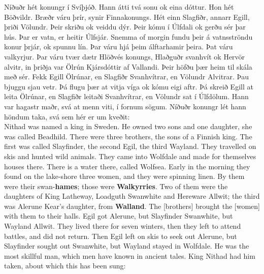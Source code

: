 
\bookStart

\bva Níðuðr hét konungr í Svíþjóð. \bva Hann átti tvá sonu ok eina dóttur. Hon hét Böðvildr. \bva Bræðr váru þrír, synir Finnakonungs. \bva Hét einn Slagfiðr, annarr Egill, þriði Völundr. \bva Þeir skriðu ok veiddu dýr. Þeir kómu í Úlfdali ok gerðu sér þar hús. \bva Þar er vatn, er heitir Úlfsjár. \bva Snemma of morgin fundu þeir á vatnsströndu konur þrjár, ok spunnu lín. \bva Þar váru hjá þeim álftarhamir þeira. Þat váru valkyrjur. \bva Þar váru tvær dætr Hlöðvés konungs, Hlaðguðr svanhvít ok Hervör alvitr, in þriðja var Ölrún Kjársdóttir af Vallandi. \bva Þeir höfðu þær heim til skála með sér. Fekk Egill Ölrúnar, en Slagfiðr Svanhvítrar, en Völundr Alvitrar. \bva Þau bjuggu sjau vetr. Þá flugu þær at vitja víga ok kómu eigi aftr. \bva Þá skreið Egill at leita Ölrúnar, en Slagfiðr leitaði Svanhvítrar, en Völundr sat í Úlfdölum. \bva Hann var hagastr maðr, svá at menn viti, í fornum sögum. \bva Níðuðr konungr lét hann höndum taka, svá sem hér er um kveðit: \\%

\bvb Nithad was named a king in Sweden. \bvb He owned two sons and one daughter, she was called Beadhild. \bvb There were three brothers, the sons of a Finnish king. \bvb The first was called Slayfinder, the second Egil, the third Wayland. \bvb They travelled on skis and hunted wild animals. They came into Wolfdale and made for themselves houses there. \bvb There is a water there, called Wolfsea. \bvb Early in the morning they found on the lake-shore three women, and they were spinning linen. \bvb By them were their swan-\textbf{hames}; those were \textbf{Walkyrries}. \bvb Two of them were the daughters of King Latheway, Loadguth Swanwhite and Hereware Allwit; the third was Alerune Kear's daughter, from \textbf{Walland}. \bvb The [brothers] brought the [women] with them to their halls. Egil got Alerune, but Slayfinder Swanwhite, but Wayland Allwit. \bvb They lived there for seven winters, then they left to attend battles, and did not return. \bvb Then Egil left on skis to seek out Alerune, but Slayfinder sought out Swanwhite, but Wayland stayed in Wolfdale. \bvb He was the most skillful man, which men have known in ancient tales. \bvb King Nithad had him taken, about which this has been sung: \\

\chapterStart

